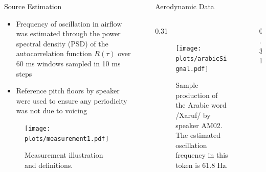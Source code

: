 \documentclass[final]{beamer}
\newlength{\sepwid}
\newlength{\onecolwid}
\newlength{\twocolwid}
\begin{document}
\begin{frame}[t]
\begin{columns}[t]
\begin{column}{\onecolwid}

\begin{block}{Source Estimation}
  \begin{itemize}
    \item Frequency of oscillation in airflow was estimated through the power spectral density (PSD) of the autocorrelation function $R(\tau)$ over 60 ms windows sampled in 10 ms steps
    \item Reference pitch floors by speaker were used to ensure any periodicity was not due to voicing
  \end{itemize}
  \vspace{0.25in}
  \begin{figure}
    \texttt{[image: plots/measurement1.pdf]}
    \caption{Measurement illustration and definitions.}
  \end{figure}
\end{block}

\end{column}


\begin{column}{\sepwid}\end{column} %

\begin{column}{\twocolwid} %

\begin{block}{Aerodynamic Data}

\begin{columns}[t,totalwidth=\twocolwid] %

\begin{column}{0.31\twocolwid} %

\begin{figure}
\texttt{[image: plots/arabicSignal.pdf]}
\caption{Sample production of the Arabic word /Xa\textlengthmark ru\textlengthmark f/ by speaker AM02. The estimated oscillation frequency in this token is 61.8 Hz.}
\end{figure}

\end{column}

\begin{column}{0.31\twocolwid} %


\end{column}
\end{columns}
\end{block}
\end{column}
\end{columns}
\end{frame}
\end{document}
